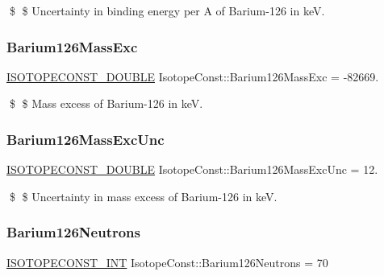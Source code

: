 \$ \$ Uncertainty in binding energy per A of Barium-\/126 in keV. \mbox{\label{group___isotope_const-_barium-_ba126_ga60999e12f8a652e538e7a0ded5f71b46}} 
\subsubsection{\texorpdfstring{Barium126\+Mass\+Exc}{Barium126MassExc}}
{\footnotesize\ttfamily \mbox{\hyperlink{group___isotope_const-_macros_ga8f45a7272ce02c0b4c65c44636ed719a}{I\+S\+O\+T\+O\+P\+E\+C\+O\+N\+S\+T\+\_\+\+D\+O\+U\+B\+LE}} Isotope\+Const\+::\+Barium126\+Mass\+Exc = -\/82669.}

\$ \$ Mass excess of Barium-\/126 in keV. \mbox{\label{group___isotope_const-_barium-_ba126_ga59a4520327094da8e955099847dd3ff0}} 
\subsubsection{\texorpdfstring{Barium126\+Mass\+Exc\+Unc}{Barium126MassExcUnc}}
{\footnotesize\ttfamily \mbox{\hyperlink{group___isotope_const-_macros_ga8f45a7272ce02c0b4c65c44636ed719a}{I\+S\+O\+T\+O\+P\+E\+C\+O\+N\+S\+T\+\_\+\+D\+O\+U\+B\+LE}} Isotope\+Const\+::\+Barium126\+Mass\+Exc\+Unc = 12.}

\$ \$ Uncertainty in mass excess of Barium-\/126 in keV. \mbox{\label{group___isotope_const-_barium-_ba126_gaa25e725574a092a6af2c9d2cbfbe8078}} 
\subsubsection{\texorpdfstring{Barium126\+Neutrons}{Barium126Neutrons}}
{\footnotesize\ttfamily \mbox{\hyperlink{group___isotope_const-_macros_ga5f18360b3e99483a35c32d789e62621c}{I\+S\+O\+T\+O\+P\+E\+C\+O\+N\+S\+T\+\_\+\+I\+NT}} Isotope\+Const\+::\+Barium126\+Neutrons = 70}

